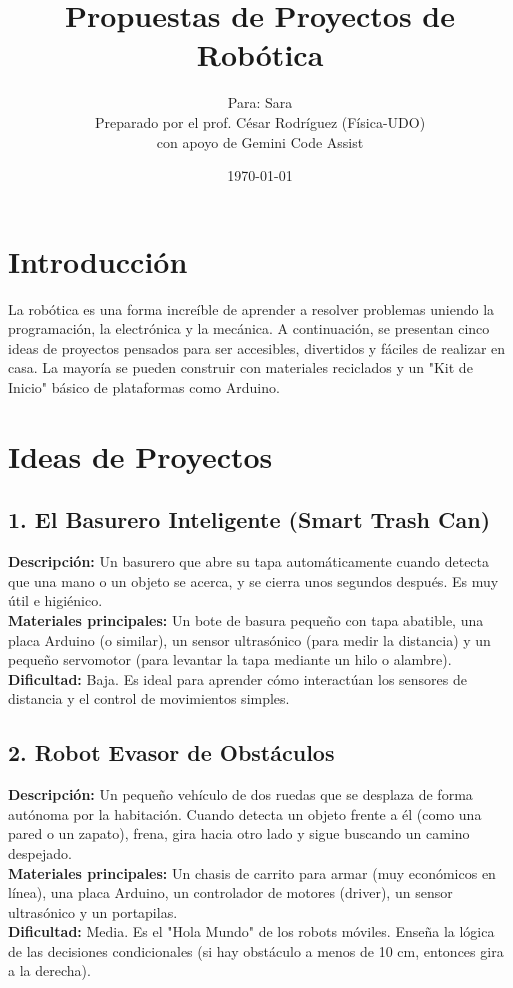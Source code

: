 \documentclass[12pt,a4paper]{article}
\title{Propuestas de Proyectos de Robótica}
\author{Para: Sara \\ \small Preparado por el prof. César Rodríguez (Física-UDO) \\ \small con apoyo de Gemini Code Assist}
\date{\today}
\begin{document}
\maketitle

\section{Introducción}
La robótica es una forma increíble de aprender a resolver problemas uniendo la programación, la electrónica y la mecánica. A continuación, se presentan cinco ideas de proyectos pensados para ser accesibles, divertidos y fáciles de realizar en casa. La mayoría se pueden construir con materiales reciclados y un "Kit de Inicio" básico de plataformas como Arduino.

\section{Ideas de Proyectos}

\subsection{1. El Basurero Inteligente (Smart Trash Can)}
\textbf{Descripción:} Un basurero que abre su tapa automáticamente cuando detecta que una mano o un objeto se acerca, y se cierra unos segundos después. Es muy útil e higiénico. \\
\textbf{Materiales principales:} Un bote de basura pequeño con tapa abatible, una placa Arduino (o similar), un sensor ultrasónico (para medir la distancia) y un pequeño servomotor (para levantar la tapa mediante un hilo o alambre). \\
\textbf{Dificultad:} Baja. Es ideal para aprender cómo interactúan los sensores de distancia y el control de movimientos simples.

\subsection{2. Robot Evasor de Obstáculos}
\textbf{Descripción:} Un pequeño vehículo de dos ruedas que se desplaza de forma autónoma por la habitación. Cuando detecta un objeto frente a él (como una pared o un zapato), frena, gira hacia otro lado y sigue buscando un camino despejado. \\
\textbf{Materiales principales:} Un chasis de carrito para armar (muy económicos en línea), una placa Arduino, un controlador de motores (driver), un sensor ultrasónico y un portapilas. \\
\textbf{Dificultad:} Media. Es el "Hola Mundo" de los robots móviles. Enseña la lógica de las decisiones condicionales (si hay obstáculo a menos de 10 cm, entonces gira a la derecha).
\end{document}

